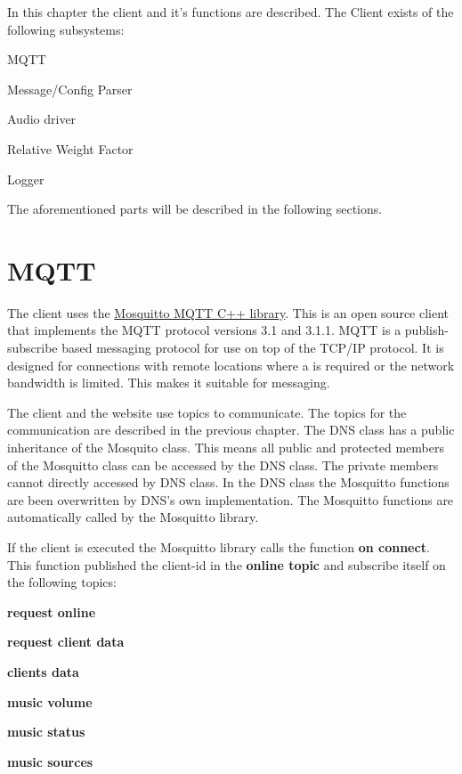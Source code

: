 In this chapter the client and it's functions are described. The Client exists of the following subsystems:
\begin{shortlist}
    \item MQTT
    \item Message/Config Parser
    \item Audio driver
    \item Relative Weight Factor
    \item Logger
\end{shortlist}

The aforementioned parts will be described in the following sections.

\section{MQTT}

The client uses the \href{http://mosquitto.org/}{Mosquitto MQTT C++ library}.
This is an open source client that implements the MQTT protocol versions 3.1 and 3.1.1.
MQTT is a publish-subscribe based  messaging protocol for use on top of the TCP/IP protocol.
It is designed for connections with remote locations where a  is required or the network bandwidth is limited.
This makes it suitable for  messaging.

The client and the website use topics to communicate. The topics for the communication are described in the previous chapter.
The DNS class has a public inheritance of the Mosquito class.
This means all public and protected members of the Mosquitto class can be accessed by the DNS class.
The private members cannot directly accessed by DNS class. In the DNS class the Mosquitto functions are been overwritten by DNS's own implementation.
The Mosquitto functions are automatically called by the Mosquitto library.

If the client is executed the Mosquitto library calls the function \textbf{on connect}.
This function published the client-id in the \textbf{online topic} and subscribe itself on the following topics:

\begin{shortlist}
	\item \textbf{request online}
	\item \textbf{request client data}
	\item \textbf{clients data}
	\item \textbf{music volume}
	\item \textbf{music status}
	\item \textbf{music sources}
\end{shortlist}

